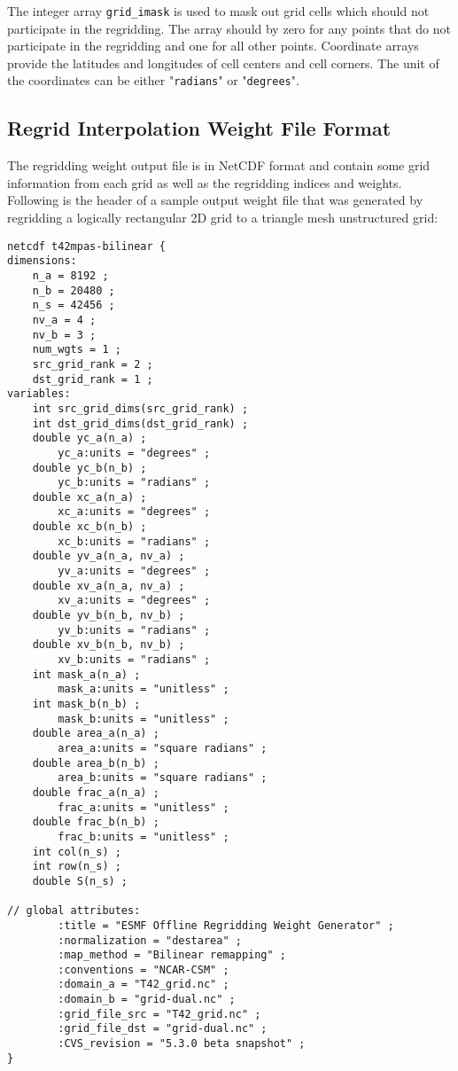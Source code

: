 The integer array {\tt grid\_imask} is used to mask out grid cells which should
not participate in the regridding. The array should by zero for any points
that do not participate in the regridding and one for all other points.
Coordinate arrays provide the latitudes and longitudes of cell centers
and cell corners. The unit of the coordinates can be either "{\tt radians}" or "{\tt degrees}". 


\subsection{Regrid Interpolation Weight File Format}\label{sec:weightfileformat}

The regridding weight output file is in NetCDF format and contain some grid
information from each grid as well as the regridding indices and weights.
Following is the header of a sample output weight file that was generated by 
regridding a logically rectangular 2D grid to a triangle mesh unstructured grid:

\begin{verbatim}
netcdf t42mpas-bilinear {
dimensions:
	n_a = 8192 ;
	n_b = 20480 ;
	n_s = 42456 ;
	nv_a = 4 ;
	nv_b = 3 ;
	num_wgts = 1 ;
	src_grid_rank = 2 ;
	dst_grid_rank = 1 ;
variables:
	int src_grid_dims(src_grid_rank) ;
	int dst_grid_dims(dst_grid_rank) ;
	double yc_a(n_a) ;
		yc_a:units = "degrees" ;
	double yc_b(n_b) ;
		yc_b:units = "radians" ;
	double xc_a(n_a) ;
		xc_a:units = "degrees" ;
	double xc_b(n_b) ;
		xc_b:units = "radians" ;
	double yv_a(n_a, nv_a) ;
		yv_a:units = "degrees" ;
	double xv_a(n_a, nv_a) ;
		xv_a:units = "degrees" ;
	double yv_b(n_b, nv_b) ;
		yv_b:units = "radians" ;
	double xv_b(n_b, nv_b) ;
		xv_b:units = "radians" ;
	int mask_a(n_a) ;
		mask_a:units = "unitless" ;
	int mask_b(n_b) ;
		mask_b:units = "unitless" ;
	double area_a(n_a) ;
		area_a:units = "square radians" ;
	double area_b(n_b) ;
		area_b:units = "square radians" ;
	double frac_a(n_a) ;
		frac_a:units = "unitless" ;
	double frac_b(n_b) ;
		frac_b:units = "unitless" ;
	int col(n_s) ;
	int row(n_s) ;
	double S(n_s) ;

// global attributes:
		:title = "ESMF Offline Regridding Weight Generator" ;
		:normalization = "destarea" ;
		:map_method = "Bilinear remapping" ;
		:conventions = "NCAR-CSM" ;
		:domain_a = "T42_grid.nc" ;
		:domain_b = "grid-dual.nc" ;
		:grid_file_src = "T42_grid.nc" ;
		:grid_file_dst = "grid-dual.nc" ;
		:CVS_revision = "5.3.0 beta snapshot" ;
}
\end{verbatim}

